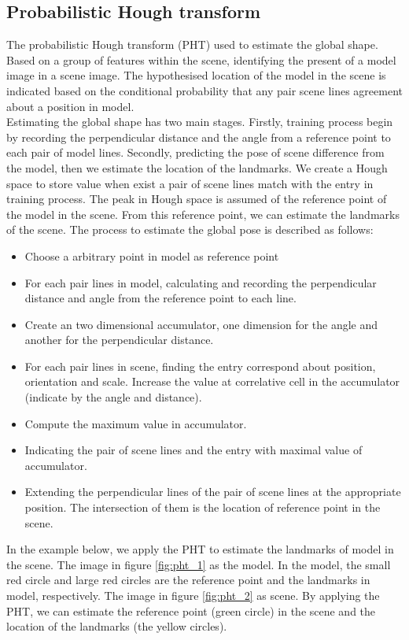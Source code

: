 \subsection{Probabilistic Hough transform}
The probabilistic Hough transform (PHT) used to estimate the global shape. Based on a group of features within the scene, identifying the present of a model image in a scene image. The hypothesised location of the model in the scene is indicated based on the conditional probability that any pair scene lines agreement about a position in model.\\[0.3cm]
Estimating the global shape has two main stages. Firstly, training process begin by recording the perpendicular distance and the angle from a reference point to each pair of model lines. Secondly, predicting the pose of scene difference from the model, then we estimate the location of the landmarks. We create a Hough space to store value when exist a pair of scene lines match with the entry in training process. The peak in Hough space is assumed of the reference point of the model in the scene. From this reference point, we can estimate the landmarks of the scene.
The process to estimate the global pose is described as follows:
\begin{itemize}
\item Choose a arbitrary point in model as reference point
\item For each pair lines in model, calculating and recording the perpendicular distance and angle from the reference point to each line.
\item Create an two dimensional accumulator, one dimension for the angle and another for the perpendicular distance.
\item For each pair lines in scene, finding the entry correspond about position, orientation and scale. Increase the value at correlative cell in the accumulator (indicate by the angle and distance).
\item Compute the maximum value in accumulator.
\item Indicating the pair of scene lines and the entry with maximal value of accumulator.
\item Extending the perpendicular lines of the pair of scene lines at the appropriate position. The intersection of them is the location of reference point in the scene.
\end{itemize}
In the example below, we apply the PHT to estimate the landmarks of model in the scene. The image in figure \ref{fig:pht_1} as the model. In the model, the small red circle and large red circles are the reference point and the landmarks in model, respectively. The image in figure \ref{fig:pht_2} as scene. By applying the PHT, we can estimate the reference point (green circle) in the scene and the location of the landmarks (the yellow circles).
